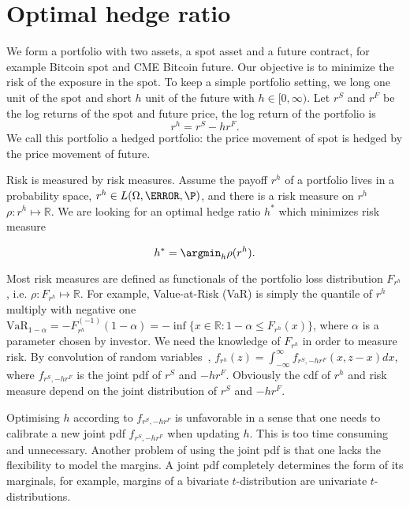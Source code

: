 \section{Optimal hedge ratio}
\label{sec:optimal-hedge-ratio}
We form a portfolio with two assets, a spot asset and a future contract, for example Bitcoin spot and CME Bitcoin future.
Our objective is to minimize the risk of the exposure in the spot.
To keep a simple portfolio setting, we long one unit of the spot and short $h$ unit of the future with $h \in [0, \infty)$.
Let $r^S$ and $r^F$ be the log returns of the spot and future price, the log return of the portfolio is
\[r^h = r^S -h r^F.\]
We call this portfolio a hedged portfolio: the price movement of spot is hedged by the price movement of future.
\medskip



Risk is measured by risk measures.
Assume the payoff $r^h$ of a portfolio lives in a probability space, $r^h \in L(\Omega,\F, \P)$,
and there is a risk measure on $r^h$ $\rho: r^h \mapsto \mathbb{R}$.
We are looking for an optimal hedge ratio $h^*$ which minimizes risk measure

\[h^* = \argmin_h \rho(r^h).\]

Most risk measures are defined as functionals of the portfolio loss distribution $F_{r^h}$, i.e. $\rho: F_{r^h} \mapsto \mathbb{R}$.
For example, Value-at-Risk (VaR) is simply the quantile of $r^h$ multiply with negative one $\text{VaR}_{1-\alpha} = -F_{r^h}^{(-1)}(1-\alpha) = -\inf\{x \in \mathbb{R}: 1-\alpha \leq F_{r^h}(x) \}$, where $\alpha$ is a parameter chosen by investor.
We need the knowledge of $F_{r^h}$ in order to measure risk.
By convolution of random variables~\citep{WKHMVA}, $f_{r^h}(z) = \int_{-\infty}^{\infty}f_{r^S, -hr^F}(x, z-x)dx$, where
$f_{r^S, -hr^F}$ is the joint pdf of $r^S$ and $-hr^F$.
Obviously the cdf of $r^h$ and risk measure depend on the joint distribution of $r^S$ and $-hr^F$.\medskip

Optimising $h$ according to $f_{r^S,-hr^F}$ is unfavorable in a sense that one needs to calibrate a new joint pdf $f_{r^S, -hr^F}$ when updating $h$.
This is too time consuming and unnecessary.
Another problem of using the joint pdf is that one lacks the flexibility to model the margins.
A joint pdf completely determines the form of its marginals, for example, margins of a bivariate $t$-distribution are
univariate $t$-distributions.\medskip

